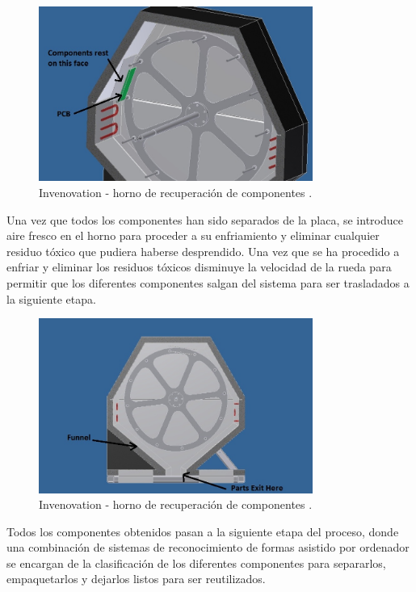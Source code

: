 \begin{figure}[H]
\begin{center}
\includegraphics[width=0.8\textwidth]{img/D6}
\caption{Invenovation - horno de recuperación de componentes \cite{invenovation}.}
\end{center}
\end{figure}

Una vez que todos los componentes han sido separados de la placa, se introduce aire fresco en el horno para proceder a su enfriamiento y eliminar cualquier residuo tóxico que pudiera haberse desprendido. Una vez que se ha procedido a enfriar y eliminar los residuos tóxicos disminuye la velocidad de la rueda para permitir que los diferentes componentes salgan del sistema para ser trasladados a la siguiente etapa.

\begin{figure}[H]
\begin{center}
\includegraphics[width=0.8\textwidth]{img/D5}
\caption{Invenovation - horno de recuperación de componentes \cite{invenovation}.}
\end{center}
\end{figure}

Todos los componentes obtenidos pasan a la siguiente etapa del proceso, donde una combinación de sistemas de reconocimiento de formas asistido por ordenador se encargan de la clasificación de los diferentes componentes para separarlos, empaquetarlos y dejarlos listos para ser reutilizados.

